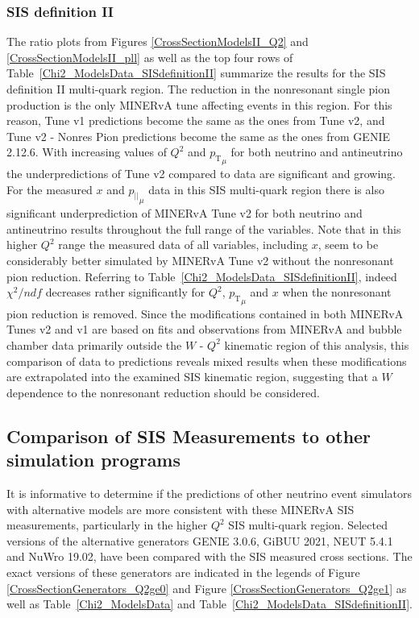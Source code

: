 \documentclass[aps, prd, twocolumn, showpacs, superscriptaddress, floatfix]{revtex4-2}
\begin{document}
\subsubsection{SIS definition II}
The ratio plots from Figures \ref{CrossSectionModelsII_Q2} and \ref{CrossSectionModelsII_pll} as well as the top four rows of Table~\ref{Chi2_ModelsData_SISdefinitionII} summarize the results for the SIS definition II multi-quark region. The reduction in the nonresonant single pion production is the only MINERvA tune affecting events in this region. For this reason, Tune v1 predictions become the same as the ones from Tune v2, and Tune v2 - Nonres Pion predictions become the same as the ones from GENIE 2.12.6.
With increasing values of $Q^2$ and ${p_\mathrm{T}}_\mu$ for both neutrino and antineutrino the underpredictions of Tune v2 compared to data are significant and growing.   For the measured $x$ and ${p_{||}}_\mu$ data in this SIS multi-quark region there is also significant underprediction of MINERvA Tune v2 for both neutrino and antineutrino results throughout the full range of the variables. 
Note that in this higher $Q^2$ range the measured data of all variables, including $x$, seem to be considerably better simulated by MINERvA Tune v2 without the nonresonant pion reduction. Referring to Table~\ref{Chi2_ModelsData_SISdefinitionII}, indeed $\chi^2/ndf$ decreases rather significantly for $Q^2$, ${p_\mathrm{T}}_\mu$ and $x$ when the nonresonant pion reduction is removed. Since the modifications contained in both MINERvA Tunes v2 and v1 are based on fits and observations from MINERvA and bubble chamber data primarily outside the $W$ - $Q^2$ kinematic region of this analysis, this comparison of data to predictions reveals mixed results when these modifications are extrapolated into the examined SIS kinematic region, suggesting that a $W$ dependence to the nonresonant reduction should be considered.

\subsection{Comparison of SIS Measurements to other simulation programs}
It is informative to determine if the predictions of other neutrino event simulators with alternative models are more consistent with these MINERvA SIS measurements, particularly in the higher $Q^2$ SIS multi-quark region. Selected versions of the alternative generators GENIE 3.0.6, GiBUU 2021, NEUT 5.4.1 and NuWro 19.02, have been compared with the SIS measured cross sections. The exact versions of these generators are indicated in the legends of Figure \ref{CrossSectionGenerators_Q2ge0} and Figure \ref{CrossSectionGenerators_Q2ge1} as well as Table~\ref{Chi2_ModelsData} and Table~\ref{Chi2_ModelsData_SISdefinitionII}. 
\end{document}

